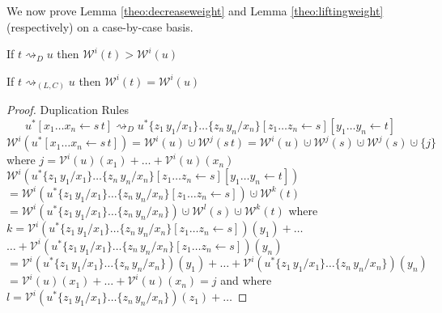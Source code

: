 \documentclass[a4paper,UKenglish,cleveref, autoref]{lipics-v2019}
\newcommand{\set}[1]{ \{ #1 \} }
\newcommand{\app}[2]{#1 \, #2}
\newcommand{\share}[3]{#1 [#2 \leftarrow #3]}
\newcommand{\sub}[3]{#1 \{ #2 / #3 \}}
\newcommand{\weight}[2]{\mathcal{W}^{#1}(#2)}
\newcommand{\weightvar}[2]{\mathcal{V}^{#1}(#2)}
\begin{document}
We now prove Lemma \ref{theo:decreaseweight} and Lemma  \ref{theo:liftingweight} (respectively) on a case-by-case basis.
\begin{center}
If $t \rightsquigarrow_{D} u$ then $\weight{i}{t} > \weight{i}{u}$
\end{center}

\begin{center}
If $t \rightsquigarrow_{(L, C)} u$ then $\weight{i}{t} = \weight{i}{u}$
\end{center}

\begin{proof}
Duplication Rules
\newline
$$\share{u^{*}}{x_{1} \dots x_{n}}{\app{s}{t}} \rightsquigarrow_{D} \share{\share{\sub{\sub{u^{*}}{\app{z_{1}}{y_{1}}}{x_{1}}\dots}{\app{z_{n}}{y_{n}}}{x_{n}}}{z_{1} \dots z_{n}}{s}}{y_{1} \dots y_{n}}{t}$$
$\weight{i}{\share{u^{*}}{x_{1} \dots x_{n}}{\app{s}{t}}} = \weight{i}{u} \cupdot \weight{j}{\app{s}{t}}
= \weight{i}{u} \cupdot \weight{j}{s} \cupdot \weight{j}{s} \cupdot \set{j}$
\newline
where $j = \weightvar{i}{u}(x_{1}) + \dots + \weightvar{i}{u}(x_{n})$
\newline
$\weight{i}{\share{\share{\sub{\sub{u^{*}}{\app{z_{1}}{y_{1}}}{x_{1}}\dots}{\app{z_{n}}{y_{n}}}{x_{n}}}{z_{1} \dots z_{n}}{s}}{y_{1} \dots y_{n}}{t}}$
\newline
$= \weight{i}{\share{\sub{\sub{u^{*}}{\app{z_{1}}{y_{1}}}{x_{1}}\dots}{\app{z_{n}}{y_{n}}}{x_{n}}}{z_{1} \dots z_{n}}{s}} \cupdot \weight{k}{t}$
\newline
$= \weight{i}{\sub{\sub{u^{*}}{\app{z_{1}}{y_{1}}}{x_{1}}\dots}{\app{z_{n}}{y_{n}}}{x_{n}}} \cupdot \weight{l}{s} \cupdot \weight{k}{t}$
\newline
where $k = \weightvar{i}{\share{\sub{\sub{u^{*}}{\app{z_{1}}{y_{1}}}{x_{1}}\dots}{\app{z_{n}}{y_{n}}}{x_{n}}}{z_{1} \dots z_{n}}{s}}(y_{1}) + \dots$
\newline
\indent $\dots + \weightvar{i}{\share{\sub{\sub{u^{*}}{\app{z_{1}}{y_{1}}}{x_{1}}\dots}{\app{z_{n}}{y_{n}}}{x_{n}}}{z_{1} \dots z_{n}}{s}}(y_{n})$
\newline
$= \weightvar{i}{\sub{\sub{u^{*}}{\app{z_{1}}{y_{1}}}{x_{1}}\dots}{\app{z_{n}}{y_{n}}}{x_{n}}}(y_{1}) + \dots + \weightvar{i}{\sub{\sub{u^{*}}{\app{z_{1}}{y_{1}}}{x_{1}}\dots}{\app{z_{n}}{y_{n}}}{x_{n}}}(y_{n})$
\newline
$= \weightvar{i}{u}(x_{1}) + \dots + \weightvar{i}{u}(x_{n}) = j$
\newline
and where $l = \weightvar{i}{\sub{\sub{u^{*}}{\app{z_{1}}{y_{1}}}{x_{1}}\dots}{\app{z_{n}}{y_{n}}}{x_{n}}}(z_{1}) + \dots$

\end{proof}
\end{document}
